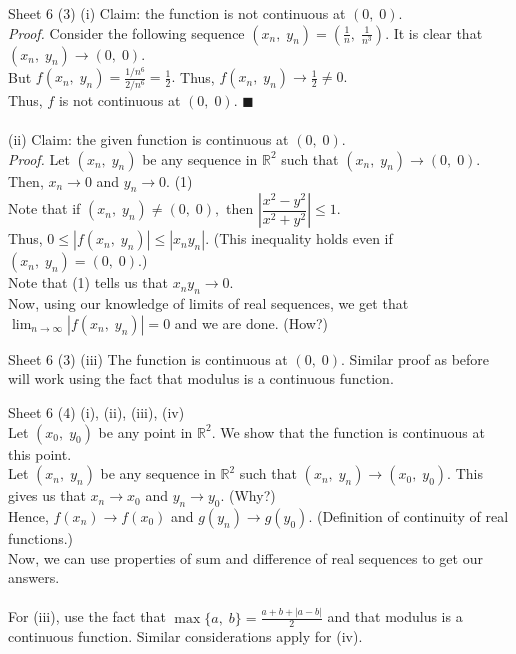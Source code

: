 \documentclass[handout, aspectratio=169]{beamer}
\begin{document}
\begin{frame}{Sheet 6}
	(3) (i) Claim: the function is not continuous at $(0,\;0).$\\
	\emph{Proof.} Consider the following sequence $(x_n,\;y_n) = \left(\frac{1}{n},\;\frac{1}{n^3}\right).$ It is clear that $(x_n,\;y_n) \to (0,\;0).$\\
	But $f(x_n,\;y_n) = \frac{1/n^6}{2/n^6} = \frac{1}{2}.$ Thus, $f(x_n,\;y_n) \to \frac{1}{2} \neq 0.$\\
	Thus, $f$ is not continuous at $(0,\;0).$ \hfill $\blacksquare$\\~\\
	(ii) Claim: the given function is continuous at $(0,\;0).$\\
	\emph{Proof.} Let $(x_n,\;y_n)$ be any sequence in $\mathbb{R}^2$ such that $(x_n,\;y_n) \to (0,\;0).$ Then, $x_n \to 0$ and $y_n \to 0.$ \hfill (1)\\
	Note that if $(x_n,\;y_n) \neq (0,\;0),$ then $\left|\dfrac{x^2 - y^2}{x^2 + y^2}\right| \le 1.$\\
	Thus, $0 \le |f(x_n,\;y_n)| \le \left|x_ny_n\right|.$ \hfill (This inequality holds even if $(x_n,\;y_n) = (0,\;0).$)\\
	Note that (1) tells us that $x_ny_n \to 0.$\\
	Now, using our knowledge of limits of real sequences, we get that $\displaystyle\lim_{n\to \infty}|f(x_n,\;y_n)| = 0$ and we are done. \hfill (How?)
\end{frame}
\begin{frame}{Sheet 6}
	(3) (iii) The function is continuous at $(0,\;0).$ Similar proof as before will work using the fact that modulus is a continuous function.
\end{frame}
\begin{frame}{Sheet 6}
	(4) (i), (ii), (iii), (iv) \\
	Let $(x_0,\;y_0)$ be any point in $\mathbb{R}^2.$ We show that the function is continuous at this point.\\
	Let $(x_n,\;y_n)$ be any sequence in $\mathbb{R}^2$ such that $(x_n,\;y_n) \to (x_0,\;y_0).$ This gives us that $x_n \to x_0$ and $y_n \to y_0.$ \hfill (Why?)\\
	Hence, $f(x_n) \to f(x_0)$ and $g(y_n) \to g(y_0).$ (Definition of continuity of real functions.)\\
	Now, we can use properties of sum and difference of real sequences to get our answers.\\~\\
	For (iii), use the fact that $\max\{a,\;b\} = \frac{a + b + |a - b|}{2}$ and that modulus is a continuous function. Similar considerations apply for (iv).
\end{frame}
\end{document}
